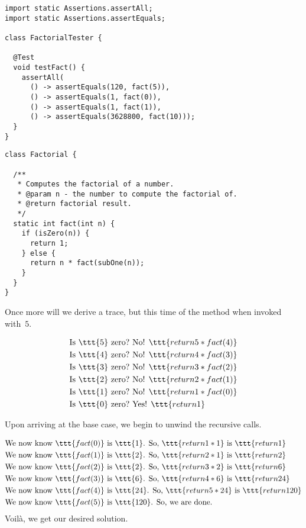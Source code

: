 \begin{lstlisting}[language=MyJava]
import static Assertions.assertAll;
import static Assertions.assertEquals;

class FactorialTester {
  
  @Test
  void testFact() {
    assertAll(
      () -> assertEquals(120, fact(5)),
      () -> assertEquals(1, fact(0)),
      () -> assertEquals(1, fact(1)),
      () -> assertEquals(3628800, fact(10)));
  }
}
\end{lstlisting}
\begin{lstlisting}[language=MyJava]
class Factorial {

  /**
   * Computes the factorial of a number.
   * @param n - the number to compute the factorial of.
   * @return factorial result.
   */
  static int fact(int n) {
    if (isZero(n)) {
      return 1;
    } else {
      return n * fact(subOne(n));
    }
  }
}
\end{lstlisting}

Once more will we derive a trace, but this time of the  method when invoked with~$5$.

\begin{align*}
    \text{Is }\ttt{5} \text{ zero?} &\text{ No! }\ttt{return 5 * fact(4)}\\
    \text{Is }\ttt{4} \text{ zero?} &\text{ No! }\ttt{return 4 * fact(3)}\\
    \text{Is }\ttt{3} \text{ zero?} &\text{ No! }\ttt{return 3 * fact(2)}\\
    \text{Is }\ttt{2} \text{ zero?} &\text{ No! }\ttt{return 2 * fact(1)}\\
    \text{Is }\ttt{1} \text{ zero?} &\text{ No! }\ttt{return 1 * fact(0)}\\
    \text{Is }\ttt{0} \text{ zero?} &\text{ Yes! }\ttt{return 1}
\end{align*}

Upon arriving at the base case, we begin to unwind the recursive calls.

\begin{align*}
    &\text{We now know }\ttt{fact(0)} \text{ is }\ttt{1}\text{. So, } \ttt{return 1 * 1} \text{ is } \ttt{return 1}\\
    &\text{We now know }\ttt{fact(1)} \text{ is }\ttt{2}\text{. So, } \ttt{return 2 * 1} \text{ is } \ttt{return 2}\\
    &\text{We now know }\ttt{fact(2)} \text{ is }\ttt{2}\text{. So, } \ttt{return 3 * 2} \text{ is } \ttt{return 6}\\
    &\text{We now know }\ttt{fact(3)} \text{ is }\ttt{6}\text{. So, } \ttt{return 4 * 6} \text{ is } \ttt{return 24}\\
    &\text{We now know }\ttt{fact(4)} \text{ is }\ttt{24}\text{. So, } \ttt{return 5 * 24} \text{ is } \ttt{return 120}\\
    &\text{We now know }\ttt{fact(5)} \text{ is }\ttt{120}\text{. So, } \text{we are done.} 
\end{align*}
Voil\`a, we get our desired solution.

